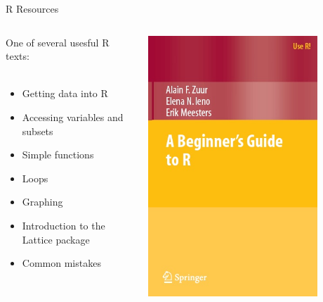 \documentclass[xcolor=svgnames]{beamer}\usepackage[]{graphicx}\usepackage[]{color}
\begin{document}
\begin{frame}[t]{R Resources}
\begin{columns}
\begin{column}{0.5\textwidth}
One of several usesful R texts:\\~\\
\begin{itemize}
\item Getting data into R 
\item Accessing variables and subsets
\item Simple functions
\item Loops
\item Graphing
\item Introduction to the Lattice package
\item Common mistakes
\end{itemize}
\end{column}
\begin{column}{0.5\textwidth}
\centerline{\includegraphics[width = 0.8\textwidth]{book3.jpeg}}
\end{column}
\end{columns}
\end{frame}
\end{document}
